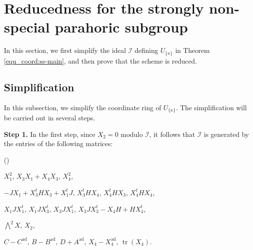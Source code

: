 \documentclass[pdflatex,sn-mathphys-num]{sn-jnl}%
\theoremstyle{thmstyleone}%
\theoremstyle{thmstyletwo}%
\numberwithin{equation}{subsection}
\theoremstyle{thmstylethree}%
\newcommand{\CI}{\ensuremath{\mathcal{I}}\xspace}
\newcommand{\ad}{\mathrm{ad}}
\DeclareMathOperator{\tr}{tr}
\newenvironment{altenumerate}
	{\begin{list}
			{(\theenumi) }
			{\usecounter{enumi}
				\setlength{\labelwidth}{0pt}
				\setlength{\labelsep}{0pt}
				\setlength{\leftmargin}{0pt}
				\setlength{\itemsep}{\the\smallskipamount}
				\renewcommand{\theenumi}{\roman{enumi}}
		}}
		{\end{list}}
\begin{document}
\section{Reducedness for the strongly non-special parahoric subgroup}\label{max}
In this section, we first simplify the ideal $\CI$ defining $U_{\{\kappa\}}$ in Theorem \ref{equ_coord:ss-main}, and then prove that the scheme is reduced.
		
\subsection{Simplification}\label{max_simp}
In this subsection, we simplify the coordinate ring of $U_{\{\kappa\}}$. The simplification will be carried out in several steps.

\bigskip
\noindent\textbf{Step 1.}
In the first step, since $X_2=0$ modulo $\CI$, it follows that $\CI$ is generated by the entries of the following matrices:
\begin{altenumerate}\label{max_simp-step-1}
    \item $X_1^2,\, X_3X_1+X_4X_3,\, X_4^2$,
			
    \item $-JX_1+X_3^t HX_3+X_1^t J,\, X_3^tHX_4,\, X_4^tHX_3,\, X_4^tHX_4$,
			
    \item $X_1JX_1^t,\, X_1JX_3^t,\, X_3JX_1^t,\, X_3JX_3^t-X_4H+HX_4^t$,
			
    \item $\bigwedge^2 X,\, X_2$,
			
    \item $C-C^{\ad},\, B-B^{\ad},\, D+A^{\ad},\, X_4-X_4^{\ad},\, \tr(X_4)$.
\end{altenumerate}
		
\end{document}
